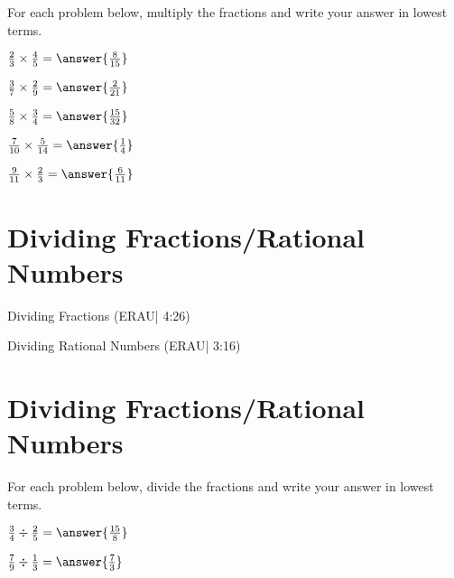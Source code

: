 \documentclass{ximera}
\begin{document}
For each problem below, multiply the fractions and write your answer in lowest terms.

\begin{problem}
$\frac{2}{3} \times \frac{4}{5} = \answer{\frac{8}{15}}$
\end{problem}

\begin{problem}
$\frac{3}{7} \times \frac{2}{9} = \answer{\frac{2}{21}}$
\end{problem}

\begin{problem}
$\frac{5}{8} \times \frac{3}{4} = \answer{\frac{15}{32}}$
\end{problem}

\begin{problem}
$\frac{7}{10} \times \frac{5}{14} = \answer{\frac{1}{4}}$
\end{problem}

\begin{problem}
$\frac{9}{11} \times \frac{2}{3} = \answer{\frac{6}{11}}$
\end{problem}


\section*{Dividing Fractions/Rational Numbers}

Dividing Fractions (ERAU| 4:26)


Dividing Rational Numbers (ERAU| 3:16)



\section*{Dividing Fractions/Rational Numbers}

For each problem below, divide the fractions and write your answer in lowest terms.

\begin{problem}
$\frac{3}{4} \div \frac{2}{5} = \answer{\frac{15}{8}}$
\end{problem}

\begin{problem}
$\frac{7}{9} \div \frac{1}{3} = \answer{\frac{7}{3}}$
\end{problem}
\end{document}
